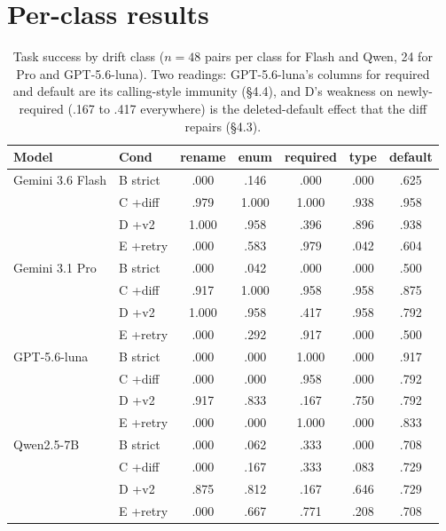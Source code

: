 \section{Per-class results}
\label{app:tables}

\begin{table}[h]
\small
\centering
\begin{tabular}{llccccc}
\toprule
Model & Cond & rename & enum & required & type & default \\
\midrule
Gemini 3.6 Flash & B strict & .000 & .146 & .000 & .000 & .625 \\
 & C +diff & .979 & 1.000 & 1.000 & .938 & .958 \\
 & D +v2 & 1.000 & .958 & .396 & .896 & .938 \\
 & E +retry & .000 & .583 & .979 & .042 & .604 \\
\midrule
Gemini 3.1 Pro & B strict & .000 & .042 & .000 & .000 & .500 \\
 & C +diff & .917 & 1.000 & .958 & .958 & .875 \\
 & D +v2 & 1.000 & .958 & .417 & .958 & .792 \\
 & E +retry & .000 & .292 & .917 & .000 & .500 \\
\midrule
GPT-5.6-luna & B strict & .000 & .000 & 1.000 & .000 & .917 \\
 & C +diff & .000 & .000 & .958 & .000 & .792 \\
 & D +v2 & .917 & .833 & .167 & .750 & .792 \\
 & E +retry & .000 & .000 & 1.000 & .000 & .833 \\
\midrule
Qwen2.5-7B & B strict & .000 & .062 & .333 & .000 & .708 \\
 & C +diff & .000 & .167 & .333 & .083 & .729 \\
 & D +v2 & .875 & .812 & .167 & .646 & .729 \\
 & E +retry & .000 & .667 & .771 & .208 & .708 \\
\bottomrule
\end{tabular}
\caption{Task success by drift class ($n{=}48$ pairs per class for Flash and Qwen, 24 for Pro and GPT-5.6-luna). Two readings: GPT-5.6-luna's columns for required and default are its calling-style immunity (\S4.4), and D's weakness on newly-required (.167 to .417 everywhere) is the deleted-default effect that the diff repairs (\S4.3).}
\label{tab:perclass}
\end{table}

